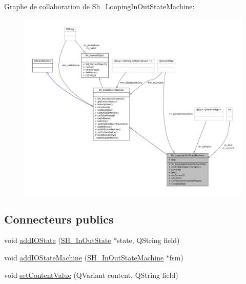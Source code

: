 Graphe de collaboration de Sh\-\_\-\-Looping\-In\-Out\-State\-Machine\-:\nopagebreak
\begin{figure}[H]
\begin{center}
\leavevmode
\includegraphics[width=350pt]{classSh__LoopingInOutStateMachine__coll__graph}
\end{center}
\end{figure}
\subsection*{Connecteurs publics}
\begin{DoxyCompactItemize}
\item 
void \hyperlink{classSH__InOutStateMachine_ad6b778d052f741daee720c047059ce0e}{add\-I\-O\-State} (\hyperlink{classSH__InOutState}{S\-H\-\_\-\-In\-Out\-State} $\ast$state, Q\-String field)
\item 
void \hyperlink{classSH__InOutStateMachine_a56954869252c7f1980abf37df9919b5e}{add\-I\-O\-State\-Machine} (\hyperlink{classSH__InOutStateMachine}{S\-H\-\_\-\-In\-Out\-State\-Machine} $\ast$fsm)
\item 
void \hyperlink{classSH__InOutStateMachine_aa2766b7a7ba39c35a10df7fc0c151b4f}{set\-Content\-Value} (Q\-Variant content, Q\-String field)
\end{DoxyCompactItemize}
